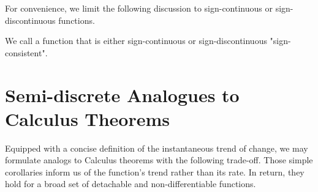 \documentclass[11pt]{book}
\begin{document}
For convenience, we limit the following discussion to sign-continuous or sign-discontinuous functions.

\begin{definition}
We call a function that is either sign-continuous or sign-discontinuous "sign-consistent".
\end{definition}


\section{Semi-discrete Analogues to Calculus Theorems}

Equipped with a concise definition of the instantaneous trend of change, we may formulate analogs to Calculus theorems with the following trade-off.  Those simple corollaries inform us of the function's trend rather than its rate. In return, they hold for a broad set of detachable and non-differentiable functions.
\end{document}
